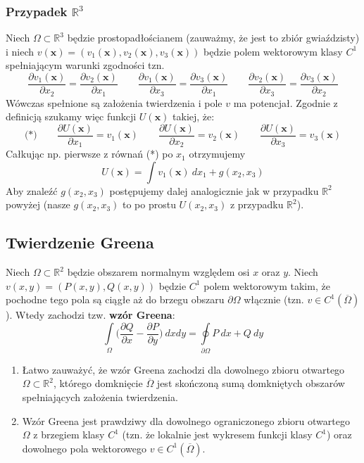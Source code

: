 \subsubsection*{Przypadek $\mathbb{R}^{3}$}
Niech $\Omega\subset\mathbb{R}^{3}$ będzie prostopadłościanem (zauważmy, że jest to zbiór gwiaździsty) i niech $v(\mathbf{x})=(v_{1}(\mathbf{x}),v_{2}(\mathbf{x}),v_{3}(\mathbf{x}))$ będzie polem wektorowym klasy $C^{1}$ spełniającym warunki zgodności tzn.
$$\frac{\partial v_{1}(\mathbf{x})}{\partial x_{2}}=\frac{\partial v_{2}(\mathbf{x})}{\partial x_{1}}\qquad \frac{\partial v_{1}(\mathbf{x})}{\partial x_{3}}=\frac{\partial v_{3}(\mathbf{x})}{\partial x_{1}}\qquad \frac{\partial v_{2}(\mathbf{x})}{\partial x_{3}}=\frac{\partial v_{3}(\mathbf{x})}{\partial x_{2}}$$
Wówczas spełnione są założenia twierdzenia i pole $v$ ma potencjał. Zgodnie z definicją szukamy więc funkcji $U(\mathbf{x})$ takiej, że:
$$\textrm{(*)}\qquad\frac{\partial U(\mathbf{x})}{\partial x_{1}}=v_{1}(\mathbf{x})\qquad \frac{\partial U(\mathbf{x})}{\partial x_{2}}=v_{2}(\mathbf{x})\qquad \frac{\partial U(\mathbf{x})}{\partial x_{3}}=v_{3}(\mathbf{x})$$
Całkując np. pierwsze z równań (*) po $x_{1}$ otrzymujemy
$$U(\mathbf{x})=\int v_{1}(\mathbf{x})\ dx_{1}+g(x_{2},x_{3})$$
Aby znaleźć $g(x_{2},x_{3})$ postępujemy dalej analogicznie jak w przypadku $\mathbb{R}^{2}$ powyżej (nasze $g(x_{2},x_{3})$ to po prostu $U(x_{2},x_{3})$ z przypadku $\mathbb{R}^{2}$).

\subsection{Twierdzenie Greena}

\begin{tw}
	Niech $\Omega\subset\mathbb{R}^{2}$ będzie obszarem normalnym względem osi $x$ oraz $y$. Niech $v(x,y)=(P(x,y),Q(x,y))$ będzie $C^{1}$ polem wektorowym takim, że pochodne tego pola są ciągłe aż do brzegu obszaru $\partial\Omega$ włącznie (tzn. $v\in C^{1}(\overline{\Omega})$). Wtedy zachodzi tzw. \textbf{wzór Greena}: $$\int\limits_{\Omega}\Big(\frac{\partial Q}{\partial x}-\frac{\partial P}{\partial y}\Big)\ dxdy=\oint\limits_{\partial \Omega}P\ dx + Q\ dy$$
\end{tw}

\begin{uwg}
	\begin{enumerate}
		\item
		Łatwo zauważyć, że wzór Greena zachodzi dla dowolnego zbioru otwartego $\Omega\subset\mathbb{R}^{2}$, którego domknięcie $\overline{\Omega}$ jest skończoną sumą domkniętych obszarów spełniających założenia twierdzenia.
		\item
		Wzór Greena jest prawdziwy dla dowolnego ograniczonego zbioru otwartego $\Omega$ z brzegiem klasy $C^{1}$ (tzn. że lokalnie jest wykresem funkcji klasy $C^{1}$) oraz dowolnego pola wektorowego $v\in C^{1}(\overline{\Omega})$.
	\end{enumerate}
\end{uwg}

